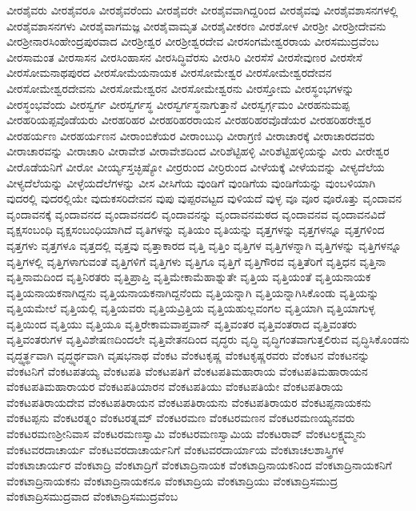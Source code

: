 {ವೀರಶೈವರು
ವೀರಶೈವರೂ
ವೀರಶೈವರೆಂದು
ವೀರಶೈವರೇ
ವೀರಶೈವವಾಗಿದ್ದರಿಂದ
ವೀರಶೈವವು
ವೀರಶೈವಶಾಸನಗಳಲ್ಲಿ
ವೀರಶೈವಶಾಸನಗಳು
ವೀರಶೈವಾಗಮಜ್ಞ
ವೀರಶೈವಾಮೃತ
ವೀರಶೈವೀಕರಣ
ವೀರಶೋಳ
ವೀರಶ್ರೀ
ವೀರಶ್ರೀದೇವನು
ವೀರಶ್ರೀನಾರಸಿಂಹೇಂದ್ರಪುರವಾದ
ವೀರಶ್ರೀಶ್ವರ
ವೀರಶ್ರೀಶ್ವರದೇವ
ವೀರಸಂಗಮೇಶ್ವರರಾಯ
ವೀರಸಮುದ್ರವೆಂಬ
ವೀರಸಾಮಂತ
ವೀರಸಾಸನ
ವೀರಸಿಂಹಾಸನ
ವೀರಸಿದ್ಧಿವೆರಸು
ವೀರಸಿರಿ
ವೀರಸೆಸೆ
ವೀರಸೇವುಣರ
ವೀರಸೇಸೆ
ವೀರಸೋಮನಾಥಪುರದ
ವೀರಸೋಮೆಯನಾಯಕ
ವೀರಸೋಮೇಶ್ವರ
ವೀರಸೋಮೇಶ್ವರದೇವನ
ವೀರಸೋಮೇಶ್ವರದೇವನು
ವೀರಸೋಮೇಶ್ವರನ
ವೀರಸೋಮೇಶ್ವರನು
ವೀರಸ್ತೋಮ
ವೀರಸ್ಥಂಭಗಳನ್ನು
ವೀರಸ್ಥಂಭವೆಂದು
ವೀರಸ್ವರ್ಗ
ವೀರಸ್ವರ್ಗಸ್ಥ
ವೀರಸ್ವರ್ಗಸ್ಥನಾಗುತ್ತಾನೆ
ವೀರಸ್ವರ್ಗ್ಗಮಂ
ವೀರಹನುಮಪ್ಪ
ವೀರಹರಿಯಪ್ಪವೊಡೆಯರು
ವೀರಹರಿಹರ
ವೀರಹರಿಹರರಾಯನ
ವೀರಹರಿಹರವೊಡೆಯರ
ವೀರಹರಿಹರೇಶ್ವರ
ವೀರಹರ್ಯಣ
ವೀರಹರ್ಯಣನ
ವೀರಾಂಬಿಕೆಯರ
ವೀರಾಂಬುಧಿ
ವೀರಾಗ್ರಣಿ
ವೀರಾಚಾರಕ್ಕೆ
ವೀರಾಚಾರದವರು
ವೀರಾಚಾರವನ್ನು
ವೀರಾಚಾರಿ
ವೀರಾವೇಶ
ವೀರಾವೇಶದಿಂದ
ವೀರಿಶೆಟ್ಟಿಹಳ್ಳಿ
ವೀರಿಶೆಟ್ಟಿಹಳ್ಳಿಯನ್ನು
ವೀರು
ವೀರೇಶ್ವರ
ವೀರೊಡೆಯನಿಗೆ
ವೀರೋ
ವೀರ್ಯ್ಯಸ್ತಚ್ಛಿಷ್ಯೋ
ವೀರ್ರರುಂದ
ವೀರ್ರಿರುಂದ
ವೀಳೆಯಕ್ಕೆ
ವೀಳೆಯವನ್ನು
ವೀಳ್ಯದೆಲೆಯ
ವೀಳ್ಯದೆಲೆಯನ್ನು
ವೀಳ್ಳೆಯದೆಲೆಗಳನ್ನು
ವೀಸ
ವೀಸಿಗೆಯ
ವುಂಡಿಗೆ
ವುಂಡಿಗೆಯ
ವುಂಡಿಗೆಯನ್ನು
ವುಂಬಳಿಯಾಗಿ
ವುದರಲ್ಲಿ
ವುದರಲ್ಲಿಯೇ
ವುದುಕಸರಿದೇವನ
ವುಪು
ವುಪ್ಪರವಟ್ಟದ
ವುಳಿಯದೆ
ವುಳ್ಳ
ವೂ
ವೂರ
ವೂರೊತ್ತು
ವೃಂದಾವನ
ವೃಂದಾವನಕ್ಕೆ
ವೃಂದಾವನದ
ವೃಂದಾವನದಲಿ
ವೃಂದಾವನನ್ನು
ವೃಂದಾವನಮಠದ
ವೃಂದಾವನವ
ವೃಂದಾವನವಿದೆ
ವೃಕ್ಷಸಂಬಂಧಿ
ವೃಕ್ಷಸಂಬಂಧಿಯಾಗಿದೆ
ವೃತಿಗಳನ್ನು
ವೃತಿಯಂ
ವೃತಿಯನ್ನು
ವೃತ್ತಗಳನ್ನು
ವೃತ್ತಗಳನ್ನೂ
ವೃತ್ತಗಳಿಂದ
ವೃತ್ತಗಳು
ವೃತ್ತಗಳೂ
ವೃತ್ತದಲ್ಲಿ
ವೃತ್ತವು
ವೃತ್ತಾಕಾರದ
ವೃತ್ತಿ
ವೃತ್ತಿಂ
ವೃತ್ತಿಗಳ
ವೃತ್ತಿಗಳನ್ನಾಗಿ
ವೃತ್ತಿಗಳನ್ನು
ವೃತ್ತಿಗಳನ್ನೂ
ವೃತ್ತಿಗಳಲ್ಲಿ
ವೃತ್ತಿಗಳಾಗುವಂತೆ
ವೃತ್ತಿಗಳಿಗೆ
ವೃತ್ತಿಗಳು
ವೃತ್ತಿಗೂ
ವೃತ್ತಿಗೆ
ವೃತ್ತಿಗೌರವ
ವೃತ್ತಿತೆರಿಗೆ
ವೃತ್ತಿಧನ
ವೃತ್ತಿನಾ
ವೃತ್ತಿನಾಮದಿಂದ
ವೃತ್ತಿನಿರತರು
ವೃತ್ತಿಪ್ರಾಪ್ತಿ
ವೃತ್ತಿಮೇಕಾಮೆಹಾಶ್ನುತೇ
ವೃತ್ತಿಯ
ವೃತ್ತಿಯಂತೆ
ವೃತ್ತಿಯನಾಯಕ
ವೃತ್ತಿಯನಾಯಕನಾಗಿದ್ದನು
ವೃತ್ತಿಯನಾಯಕನಾಗಿದ್ದನೆಂದು
ವೃತ್ತಿಯನ್ನಾಗಿ
ವೃತ್ತಿಯನ್ನಾಗಿಸಿಕೊಂಡು
ವೃತ್ತಿಯನ್ನು
ವೃತ್ತಿಯಮೇಲೆ
ವೃತ್ತಿಯಲ್ಲಿ
ವೃತ್ತಿಯವರು
ವೃತ್ತಿಯವ್ರಿತ್ತಿಯ
ವೃತ್ತಿಯಹುಲ್ಲವಂಗಲ
ವೃತ್ತಿಯಾಗಿ
ವೃತ್ತಿಯಾಗುಳ್ಳ
ವೃತ್ತಿಯಿಂದ
ವೃತ್ತಿಯು
ವೃತ್ತಿಯೂ
ವೃತ್ತಿರೇಕಾಮವಾಪ್ತವಾನ್
ವೃತ್ತಿವಂತರ
ವೃತ್ತಿವಂತರಾದ
ವೃತ್ತಿವಂತರು
ವೃತ್ತಿವಂತರುಗಳ
ವೃತ್ತಿವಿಶೇಷಣದಿಂದಲೇ
ವೃತ್ತಿವೇತನದಿಂದ
ವೃದ್ಧರು
ವೃದ್ಧಿ
ವೃದ್ಧಿಗಂತವಾಗುತ್ತಲಿರುವ
ವೃದ್ಧಿಸಿಕೊಂಡನು
ವೃದ್ಧ್ಯರ್ತ್ಥವಾಗಿ
ವೃದ್ಧ್ಯರ್ಥವಾಗಿ
ವೃಷಭನಾಥ
ವೆಂಕಟ
ವೆಂಕಟಕೃಷ್ಣ
ವೆಂಕಟಕೃಷ್ಣರವರು
ವೆಂಕಟನ
ವೆಂಕಟನನ್ನು
ವೆಂಕಟನಿಗೆ
ವೆಂಕಟಪತಯ್ಯ
ವೆಂಕಟಪತಿ
ವೆಂಕಟಪತಿಗೆ
ವೆಂಕಟಪತಿಮಹಾರಾಯ
ವೆಂಕಟಪತಿಮಹಾರಾಯನ
ವೆಂಕಟಪತಿಮಹಾರಾಯರ
ವೆಂಕಟಪತಿಯಾರನ
ವೆಂಕಟಪತಿಯು
ವೆಂಕಟಪತಿಯೇ
ವೆಂಕಟಪತಿರಾಯ
ವೆಂಕಟಪತಿರಾಯದೇವ
ವೆಂಕಟಪತಿರಾಯನ
ವೆಂಕಟಪತಿರಾಯನು
ವೆಂಕಟಪತಿರಾಯರ
ವೆಂಕಟಪ್ಪನಾಯಕನು
ವೆಂಕಟಪ್ಪನು
ವೆಂಕಟರತ್ನಂ
ವೆಂಕಟರತ್ನಮ್
ವೆಂಕಟರಮಣ
ವೆಂಕಟರಮಣನ
ವೆಂಕಟರಮಣಯ್ಯನವರು
ವೆಂಕಟರಮಣಶ್ರೀನಿವಾಸ
ವೆಂಕಟರಮಣಸ್ವಾಮಿ
ವೆಂಕಟರಮಣಸ್ವಾಮಿಯ
ವೆಂಕಟರಾವ್
ವೆಂಕಟಲಕ್ಷ್ಮಮ್ಮನು
ವೆಂಕಟವರದಾಚಾರ್ಯ
ವೆಂಕಟವರದಾಚಾರ್ಯನಿಗೆ
ವೆಂಕಟವರದಾರ್ಯಾಯ
ವೆಂಕಟಾಚಲಶಾಸ್ತ್ರಿಗಳ
ವೆಂಕಟಾಚಾರ್ಯರ
ವೆಂಕಟಾದ್ರಿ
ವೆಂಕಟಾದ್ರಿಗೆ
ವೆಂಕಟಾದ್ರಿನಾಯಕ
ವೆಂಕಟಾದ್ರಿನಾಯಕನಿಂದ
ವೆಂಕಟಾದ್ರಿನಾಯಕನಿಗೆ
ವೆಂಕಟಾದ್ರಿನಾಯಕನು
ವೆಂಕಟಾದ್ರಿನಾಯಕನೂ
ವೆಂಕಟಾದ್ರಿಯ
ವೆಂಕಟಾದ್ರಿಯು
ವೆಂಕಟಾದ್ರಿಸಮುದ್ರ
ವೆಂಕಟಾದ್ರಿಸಮುದ್ರವಾದ
ವೆಂಕಟಾದ್ರಿಸಮುದ್ರವೆಂಬ
}
